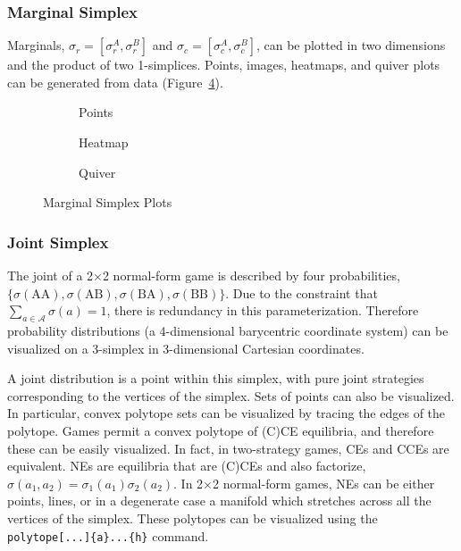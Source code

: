 \documentclass[10pt]{article}
\begin{document}
\subsubsection{Marginal Simplex}

Marginals, $\sigma_r = [\sigma_r^A, \sigma_r^B]$ and $\sigma_c = [\sigma_c^A, \sigma_c^B]$, can be plotted in two dimensions and the product of two 1-simplices. Points, images, heatmaps, and quiver plots can be generated from data (Figure~\ref{fig:marginal_simplex}).

\begin{figure}[t]
    \centering
    \footnotesize
    \begin{subfigure}[t]{0.32\linewidth}
        \marginalsimplex[width=\linewidth,points=doc_data/marginal_simplex/points.dat]
        \caption{Points}
        \label{fig:marginal_simplex_points}
    \end{subfigure}\hfill
    \begin{subfigure}[t]{0.32\linewidth}
        \marginalsimplex[width=\linewidth,heatmap=doc_data/marginal_simplex/heatmap.dat]
        \caption{Heatmap}
        \label{fig:marginal_simplex_heatmap}
    \end{subfigure}\hfill
    \begin{subfigure}[t]{0.32\linewidth}
        \marginalsimplex[width=\linewidth,quiver=doc_data/marginal_simplex/quiver.dat,quiver scale arrows=0.1]
        \caption{Quiver}
        \label{fig:marginal_simplex_quiver}
    \end{subfigure}

    \caption{Marginal Simplex Plots}
    \label{fig:marginal_simplex}
\end{figure}


\subsubsection{Joint Simplex}

The joint of a 2×2 normal-form game is described by four probabilities, $\{\sigma(\text{AA}),\allowbreak\sigma(\text{AB}),\allowbreak\sigma(\text{BA}),\allowbreak\sigma(\text{BB})\}$. Due to the constraint that $\sum_{a \in \mathcal{A}} \sigma(a) = 1$, there is redundancy in this parameterization. Therefore probability distributions (a 4-dimensional barycentric coordinate system) can be visualized on a 3-simplex in 3-dimensional Cartesian coordinates.

A joint distribution is a point within this simplex, with pure joint strategies corresponding to the vertices of the simplex. Sets of points can also be visualized. In particular, convex polytope sets can be visualized by tracing the edges of the polytope. Games permit a convex polytope of (C)CE equilibria, and therefore these can be easily visualized. In fact, in two-strategy games, CEs and CCEs are equivalent. NEs are equilibria that are (C)CEs and also factorize, $\sigma(a_1,a_2)=\sigma_1(a_1)\sigma_2(a_2)$. In 2×2 normal-form games, NEs can be either points, lines, or in a degenerate case a manifold which stretches across all the vertices of the simplex. These polytopes can be visualized using the \verb!polytope[...]{a}...{h}! command.
\end{document}

